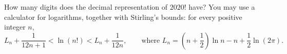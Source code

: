 How many digits does the decimal representation of $2020!$ have? You may use a calculator for logarithms, together with Stirling's bounds: for every positive integer $n$,
\[L_n+\dfrac{1}{12n+1}<\ln(n!)<L_n+\dfrac{1}{12n},\qquad\text{where }L_n=\left(n+\dfrac12\right)\ln n-n+\dfrac12\ln(2\pi).\]
